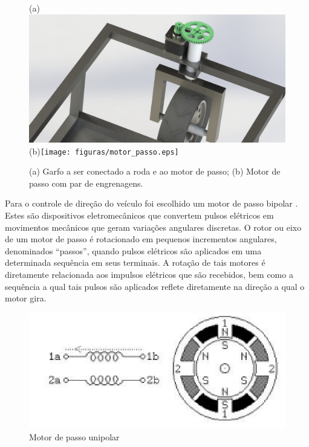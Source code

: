      \begin{figure}[!htbp]
                    	\begin{center}
                    		(a)\includegraphics[height=.3\textheight]{figuras/render3.eps}
                    		(b)\texttt{[image: figuras/motor\_passo.eps]}
                    		\caption{(a) Garfo a ser conectado a roda e ao motor de passo; (b) Motor de passo com par de engrenagens.}
                    	\end{center}
      \end{figure}
    
    Para o controle de direção do veículo foi escolhido um motor de passo bipolar \cite{brites}. Estes são dispositivos eletromecânicos que convertem pulsos elétricos em movimentos mecânicos que geram variações angulares discretas. O rotor ou eixo de um motor de passo é rotacionado em pequenos incrementos angulares, denominados “passos”, quando pulsos elétricos são aplicados em uma determinada sequência em seus terminais. A rotação de tais motores é diretamente relacionada aos impulsos elétricos que são recebidos, bem como a sequência a qual tais pulsos são aplicados reflete diretamente na direção a qual o motor gira.
    
        \begin{figure}[h]
        	\centering
        	\includegraphics[keepaspectratio=true, scale=1]{figuras/passo_unipolar.eps}
        	\caption{Motor de passo unipolar}
        	\label{fig:unipolar}
        \end{figure}
    
